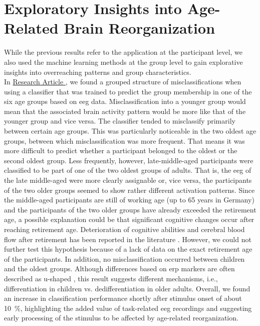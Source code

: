 \section{Exploratory Insights into Age-Related Brain Reorganization}
While the previous results refer to the application at the participant level, we also used the machine learning methods at the group level to gain explorative insights into overreaching patterns and group characteristics.\\
In \hyperref[results:paperII]{Research Article }, we found a grouped structure of misclassifications when using a classifier that was trained to predict the group membership in one of the six age groups based on \gls{eeg} data. Misclassification into a younger group would mean that the associated brain activity pattern would be more like that of the younger group and vice versa. The classifier tended to misclassify primarily between certain age groups. This was particularly noticeable in the two oldest age groups, between which misclassification was more frequent. That means it was more difficult to predict whether a participant belonged to the oldest or the second oldest group. Less frequently, however, late-middle-aged participants were classified to be part of one of the two oldest groups of adults. That is, the \gls{eeg} of the late middle-aged were more clearly assignable or, vice versa, the participants of the two older groups seemed to show rather different activation patterns. Since the middle-aged participants are still of working age (up to 65 years in Germany) and the participants of the two older groups have already exceeded the retirement age, a possible explanation could be that significant cognitive changes occur after reaching retirement age. Deterioration of cognitive abilities and cerebral blood flow after retirement has been reported in the literature \cite{Celidoni2017, Rohwedder2010, Rogers1990}. However, we could not further test this hypothesis because of a lack of data on the exact retirement age of the participants. In addition, no misclassification occurred between children and the oldest groups. Although differences based on \gls{erp} markers are often described as u-shaped \cite{Mueller2008, Reuter2019}, this result suggests different mechanisms, i.e., differentiation in children vs. dedifferentiation in older adults. Overall, we found an increase in classification performance shortly after stimulus onset of about 10~\%, highlighting the added value of task-related \gls{eeg} recordings and suggesting early processing of the stimulus to be affected by age-related reorganization.\\
